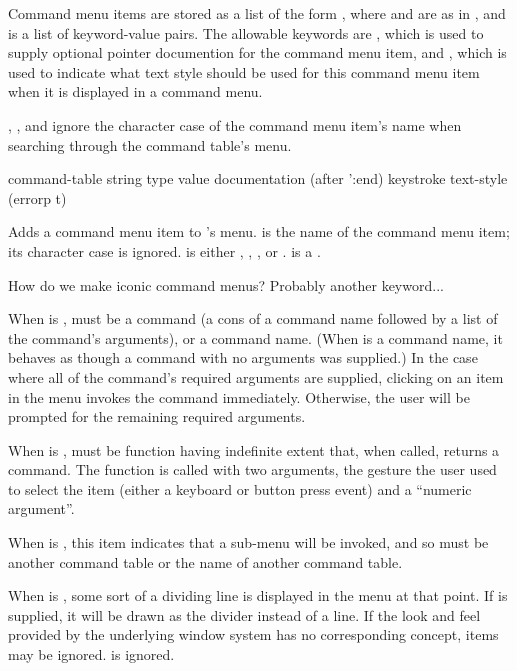 Command menu items are stored as a list of the form
, where  and 
are as in , and  is a list of
keyword-value pairs.  The allowable keywords are , which is
used to supply optional pointer documention for the command menu item, and
, which is used to indicate what text style should be used for
this command menu item when it is displayed in a command menu.

, ,
and  ignore the character case of the command menu item's
name when searching through the command table's menu.


 {command-table string type value 
                                         \key documentation (after ':end) keystroke
                                              text-style (errorp t)}

Adds a command menu item to 's menu.   is the
name of the command menu item; its character case is ignored.   is
either , , , or .
 is a .

 {How do we make iconic command menus?  Probably another keyword...}

When  is ,  must be a command (a cons of a
command name followed by a list of the command's arguments), or a command name.
(When  is a command name, it behaves as though a command with no
arguments was supplied.)  In the case where all of the command's required
arguments are supplied, clicking on an item in the menu invokes the command
immediately.  Otherwise, the user will be prompted for the remaining required
arguments.

When  is ,  must be function having
indefinite extent that, when called, returns a command.  The function is called
with two arguments, the gesture the user used to select the item (either a
keyboard or button press event) and a ``numeric argument''.

When  is , this item indicates that a sub-menu will be
invoked, and so  must be another command table or the name of
another command table.

When  is , some sort of a dividing line is displayed in
the menu at that point.  If  is supplied, it will be drawn as the
divider instead of a line.  If the look and feel provided by the underlying
window system has no corresponding concept,  items may be ignored.
 is ignored.

